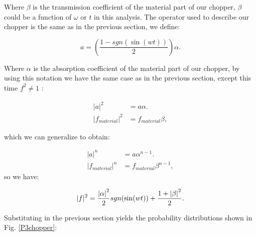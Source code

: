 \documentclass{book}
\begin{document}
Where $\beta$ is the transmission coefficient of the material part of our chopper, $\beta$ could be a function of  $\omega$ or $t$ in this analysis. The operator used to describe our chopper is the same as in the previous section, we define:

\vspace{0.5cm}
\begin{equation}
a=\left(\frac{1-sgn(\sin(wt))}{2}\right) \alpha.
\end{equation}
\vspace{0.5cm}

Where $\alpha$ is the absorption coefficient of the material part of our chopper, by using this notation we have the same case as in the previous section, except this time $f^2 \neq 1$ :

\begin{align}
|a|^2&=a \alpha.\\
|f_{material}|^2&=f_{material} \beta,
\end{align}

which we can generalize to obtain:

\begin{align}
|a|^n&=a\alpha^{n-1}.\\
|f_{material}|^n&=f_{material} \beta^{n-1},
\end{align}
so we have:

\begin{equation}
|f|^2=  \frac{\abs{\alpha}^2}{2} sgn(\sin(wt)) +\frac{1+\abs{\beta}^2}{2}.
\end{equation}



Substituting in the previous section yields the probability distributions shown in Fig. \ref{P3chopper}:
\end{document}
